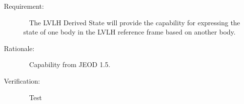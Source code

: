 
%
%
% 
%

\label{reqt:LVLH}
\begin{description}
  \item[Requirement:]\ \newline
     The LVLH Derived State will provide the capability for expressing the state of one body in the LVLH reference frame based on another body.
  \item[Rationale:]\ \newline
     Capability from JEOD 1.5.
  \item[Verification:]\ \newline
     Test
\end{description}


